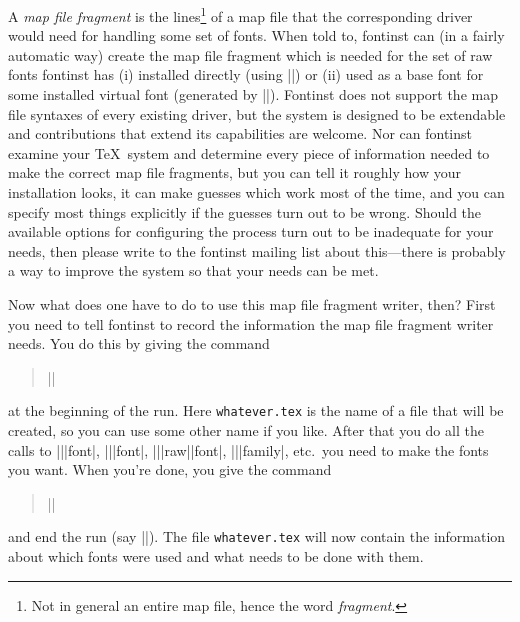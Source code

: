 \documentclass[a4paper]{ltxguide}
\newcommand*{\setpackagename}[1]{\textsf{#1}}
\newcommand{\fontinst}{\setpackagename{font\-inst}\xspace}
\newcommand{\Fontinst}{\setpackagename{Font\-inst}\xspace}
\begin{document}
A \emph{map file fragment} is the lines\footnote{Not in general an 
entire map file, hence the word \emph{fragment}.} of a map file that 
the corresponding driver would need for handling some set of fonts. 
When told to, \fontinst can (in a fairly automatic way) create 
the map file fragment which is needed for the set of raw fonts 
\fontinst has (i) installed directly (using |\installrawfont|) 
or (ii) used as a base font for some installed virtual font (generated 
by |\installfont|). \Fontinst does not support the map file 
syntaxes of every existing driver, but the system is designed to be 
extendable and contributions that extend its capabilities are welcome. 
Nor can \fontinst examine your \TeX\ system and 
determine every piece of information needed to make the correct map 
file fragments, but you can tell it roughly how your installation 
looks, it can make guesses which work most of the time, and you can 
specify most things explicitly if the guesses turn out to be wrong. 
Should the available options for configuring the process turn out to 
be inadequate for your needs, then please write to the 
\fontinst mailing list about this---there is probably a way 
to improve the system so that your needs can be met.

Now what does one have to do to use this map file fragment writer, 
then? First you need to tell \fontinst to record the 
information the map file fragment writer needs. You do this by giving 
the command
\begin{quote}
  ||
\end{quote}
at the beginning of the run. Here \texttt{whatever.tex} is the name of 
a file that will be created, so you can use some other name if you 
like. After that you do all the calls to |\transform|\-|font|, 
|\install|\-|font|, |\install|\-|raw|\-|font|, |\latin|\-|family|, 
etc.\ you need to make the fonts you want. When you're done, you give 
the command
\begin{quote}
  |\endrecordtransforms|
\end{quote}
and end the run (say |\bye|). The file \texttt{whatever.tex} will now 
contain the information about which fonts were used and what needs to 
be done with them.
\end{document}
